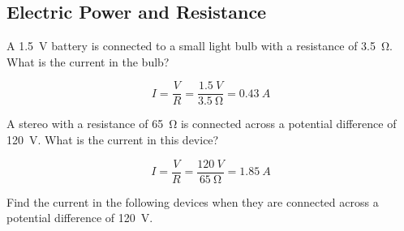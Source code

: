 \documentclass[]{exam}
\begin{document}
\clearpage

\subsection{Electric Power and Resistance}

\begin{questions}
\question
A \SI{1.5}{V} battery is connected to a small light bulb with a resistance of \SI{3.5}{\ohm}. What is the current in the bulb?

\begin{solution}
\begin{equation*}
    I = \frac{V}{R} = \frac{\SI{1.5}{V}}{\SI{3.5}{\ohm}} = \boxed{\SI{0.43}{A}}
\end{equation*}
\end{solution}

\question
A stereo with a resistance of \SI{65}{\ohm} is connected across a potential difference of \SI{120}{V}. What is the current in this device?

\begin{solution}
\begin{equation*}
    I = \frac{V}{R} = \frac{\SI{120}{V}}{\SI{65}{\ohm}} = \boxed{\SI{1.85}{A}}
\end{equation*}
\end{solution}

\question
Find the current in the following devices when they are connected across a potential difference of \SI{120}{V}.



\end{questions}
\end{document}
